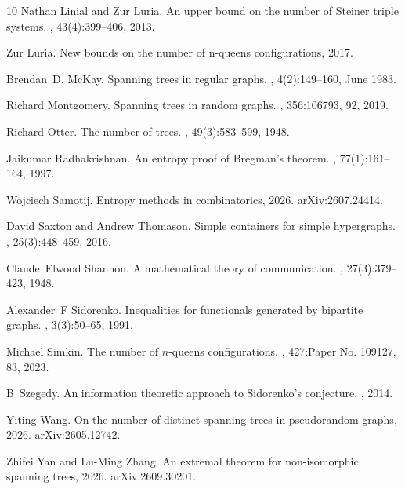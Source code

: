 \documentclass[10pt,a4paper]{amsart}
\numberwithin{equation}{section}
\theoremstyle{definition}
\theoremstyle{remark}
\begin{document}
\begin{thebibliography}{10}
Nathan Linial and Zur Luria.
\newblock An upper bound on the number of {S}teiner triple systems.
, 43(4):399--406, 2013.

Zur Luria.
\newblock New bounds on the number of n-queens configurations, 2017.

Brendan~D. McKay.
\newblock Spanning trees in regular graphs.
, 4(2):149--160, June 1983.

Richard Montgomery.
\newblock Spanning trees in random graphs.
, 356:106793, 92, 2019.

Richard Otter.
\newblock The number of trees.
, 49(3):583--599, 1948.

Jaikumar Radhakrishnan.
\newblock An entropy proof of {Bregman}'s theorem.
, 77(1):161--164, 1997.

Wojciech Samotij.
\newblock Entropy methods in combinatorics, 2026.
\newblock arXiv:2607.24414.

David Saxton and Andrew Thomason.
\newblock Simple containers for simple hypergraphs.
, 25(3):448--459, 2016.

Claude~Elwood Shannon.
\newblock A mathematical theory of communication.
, 27(3):379--423, 1948.

Alexander~F Sidorenko.
\newblock Inequalities for functionals generated by bipartite graphs.
, 3(3):50--65, 1991.

Michael Simkin.
\newblock The number of {$n$}-queens configurations.
, 427:Paper No. 109127, 83, 2023.

B~Szegedy.
\newblock An information theoretic approach to {S}idorenko’s conjecture.
, 2014.

Yiting Wang.
\newblock On the number of distinct spanning trees in pseudorandom graphs, 2026.
\newblock arXiv:2605.12742.

Zhifei Yan and Lu-Ming Zhang.
\newblock An extremal theorem for non-isomorphic spanning trees, 2026.
\newblock arXiv:2609.30201.

\end{thebibliography}
\end{document}
